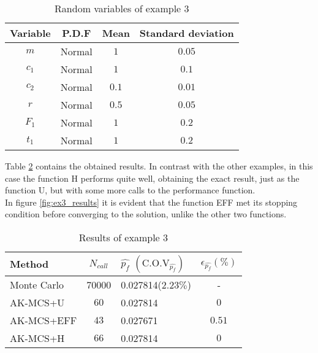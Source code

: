 \begin{table}[h]
    \footnotesize%
    \begin{center}
    \begin{tabular}{cccc}
    \toprule
    Variable & P.D.F & Mean & Standard deviation \\
    \midrule
    $m$   & Normal & $1$ & $0.05$ \\
    $c_1$   & Normal & $1$ & $0.1$ \\
    $c_2$   & Normal & $0.1$ & $0.01$ \\
    $r$   & Normal & $0.5$ & $0.05$ \\
    $F_1$   & Normal & $1$ & $0.2$ \\
    $t_1$   & Normal & $1$ & $0.2$ \\
    \bottomrule
    \end{tabular}
    \end{center}
    \caption{Random variables of example 3}
    \label{tab:var_ex3}
\end{table}

Table \ref{tab:res_ex3} contains the obtained results. In contrast with the other
examples, in this case the function H performs quite well, obtaining the exact result, just
as the function U, but with some more calls to the performance function. \\

In figure \ref{fig:ex3_results} it is evident that the function EFF met its stopping
condition before converging to the solution, unlike the other two functions.

\begin{table}[h]
    \footnotesize
    \begin{center}
    \begin{tabular}{lclc}
    \toprule
    Method & $N_{call}$  & $\widehat{p_f}$ $(\text{C.O.V}_{\widehat{p_f}})$ &$\epsilon_{\widehat{p_f}}(\%)$  \\
    \midrule
    Monte Carlo   & \num[round-precision=1,round-mode=figures]{70000} & \num{0.027814}($2.23\%$) & - \\
    AK-MCS+U & $60$ & \num{0.027814} & $0$ \\
    AK-MCS+EFF & $43$ & \num{0.027671} & $0.51$ \\
    AK-MCS+H & $66$ & \num{0.027814} & $0$ \\
    \bottomrule
    \end{tabular}
    \end{center}
    \caption{Results of example 3}
    \label{tab:res_ex3}
\end{table}

